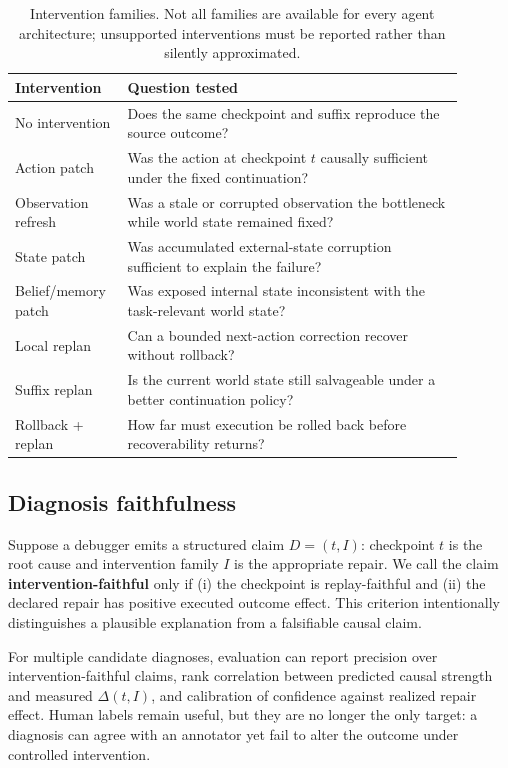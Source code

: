 \documentclass{article}
\begin{document}
\begin{table}[t]
\centering
\small
\begin{tabular}{p{0.20\linewidth}p{0.69\linewidth}}
\toprule
\textbf{Intervention} & \textbf{Question tested} \\
\midrule
No intervention & Does the same checkpoint and suffix reproduce the source outcome? \\
Action patch & Was the action at checkpoint $t$ causally sufficient under the fixed continuation? \\
Observation refresh & Was a stale or corrupted observation the bottleneck while world state remained fixed? \\
State patch & Was accumulated external-state corruption sufficient to explain the failure? \\
Belief/memory patch & Was exposed internal state inconsistent with the task-relevant world state? \\
Local replan & Can a bounded next-action correction recover without rollback? \\
Suffix replan & Is the current world state still salvageable under a better continuation policy? \\
Rollback + replan & How far must execution be rolled back before recoverability returns? \\
\bottomrule
\end{tabular}
\caption{Intervention families. Not all families are available for every agent architecture; unsupported interventions must be reported rather than silently approximated.}
\label{tab:interventions}
\end{table}

\subsection{Diagnosis faithfulness}
Suppose a debugger emits a structured claim $D=(t,I)$: checkpoint $t$ is the root cause and intervention family $I$ is the appropriate repair. We call the claim \textbf{intervention-faithful} only if (i) the checkpoint is replay-faithful and (ii) the declared repair has positive executed outcome effect. This criterion intentionally distinguishes a plausible explanation from a falsifiable causal claim.

For multiple candidate diagnoses, evaluation can report precision over intervention-faithful claims, rank correlation between predicted causal strength and measured $\Delta(t,I)$, and calibration of confidence against realized repair effect. Human labels remain useful, but they are no longer the only target: a diagnosis can agree with an annotator yet fail to alter the outcome under controlled intervention.
\end{document}
